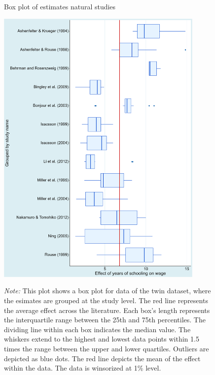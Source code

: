 \begin{figure}[!htbp]
    \begin{center}
        \caption{Box plot of estimates natural studies}
        \label{fig:box_plot_twins}
        \includegraphics[width=0.9\textwidth]{Figures/box_plot_study_name_twins.png}
    \end{center}\vspace{-0.7cm}
    \captionsetup{width=0.9\textwidth, font = scriptsize}
    \caption*{\emph{Note:} This plot shows a box plot for data of the twin dataset, where the esimates are grouped at the study level. The red line represents the average effect across the literature. Each box's length represents the interquartile range between the 25th and 75th percentiles. The dividing line within each box indicates the median value. The whiskers extend to the highest and lowest data points within 1.5 times the range between the upper and lower quartiles. Outliers are depicted as blue dots. The red line depicts the mean of the effect within the data. The data is winsorized at 1\% level.}
\end{figure}

